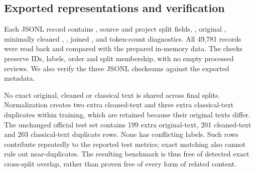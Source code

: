 \subsection{Exported representations and verification}
Each JSONL record contains , source and project split fields,
, original , minimally cleaned ,
, joined , and token-count diagnostics.
All 49,781 records were read back and compared with the prepared in-memory data.
The checks preserve IDs, labels, order and split membership, with no empty
processed reviews. We also verify the three JSONL checksums against the
exported metadata.

No exact original, cleaned or classical text is shared across final splits.
Normalization creates two extra cleaned-text and three extra classical-text
duplicates within training, which are retained because their original texts
differ. The unchanged official test set contains 199 extra original-text,
201 cleaned-text and 203 classical-text duplicate rows. None has conflicting
labels. Such rows contribute repeatedly to the reported test metrics; exact
matching also cannot rule out near-duplicates. The resulting benchmark is thus
free of detected exact cross-split overlap, rather than proven free of every
form of related content.
\FloatBarrier
